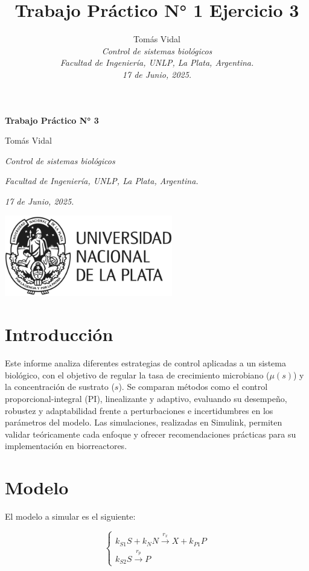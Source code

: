 \documentclass[letterpaper, 10 pt, conference]{ieeeconf}  %
\title{\LARGE \bf Trabajo Práctico N° 1 Ejercicio 3}
\author{
  Tom\'as Vidal\\
  {\it Control de sistemas biológicos}\\
  {\it Facultad de Ingenier\'ia, UNLP, La Plata, Argentina.}\\
  {\it 17 de Junio, 2025.}
}                                            %
\begin{document}
\begin{titlepage}
	\centering
	\null\vspace{4cm} %
	{\LARGE \textbf{Trabajo Práctico N° 3} \par}
	\vspace{2cm}
	{\large Tomás Vidal \par}
	{\itshape Control de sistemas biológicos \par}
	{\itshape Facultad de Ingeniería, UNLP, La Plata, Argentina. \par}
	{\itshape 17 de Junio, 2025. \par}
	\vspace{2cm}
	\includegraphics[width=0.55\textwidth]{unlp_logo.png}
	\vfill %
\end{titlepage}

\section{Introducción}

Este informe analiza diferentes estrategias de control aplicadas a un sistema biológico, con el objetivo de regular la tasa de crecimiento microbiano ($\mu(s)$) y la concentración de sustrato ($s$). Se comparan métodos como el control proporcional-integral (PI), linealizante y adaptivo, evaluando su desempeño, robustez y adaptabilidad frente a perturbaciones e incertidumbres en los parámetros del modelo. Las simulaciones, realizadas en Simulink, permiten validar teóricamente cada enfoque y ofrecer recomendaciones prácticas para su implementación en biorreactores.

\section{Modelo}
El modelo a simular es el siguiente:

\begin{equation*}
	\begin{cases}
    k_{S1} S + k_N N \xrightarrow{r_x} X + k_{P1} P \\
    k_{S2} S \xrightarrow{r_p} P
	\end{cases}
\end{equation*}
\end{document}
